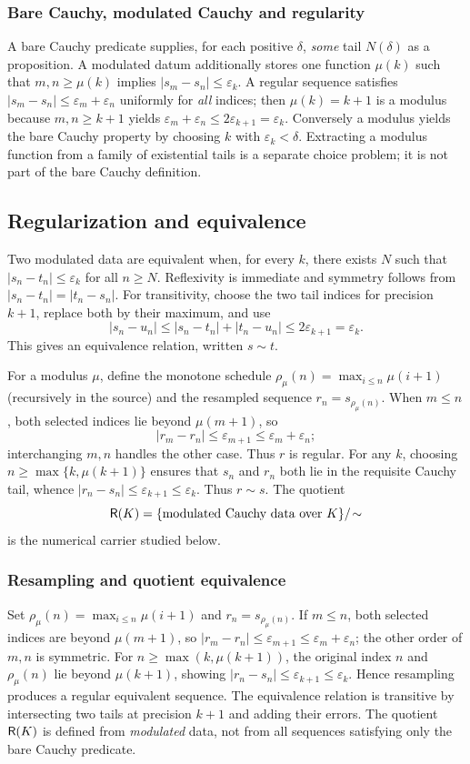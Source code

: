 \documentclass[11pt,reqno]{amsart}
\theoremstyle{definition}\newtheorem{definition}[theorem]{Definition}
\theoremstyle{remark}\newtheorem{remark}[theorem]{Remark}
\newcommand{\eps}{\varepsilon}
\begin{document}
\subsubsection*{Bare Cauchy, modulated Cauchy and regularity}\label{supp:12-2}
A bare Cauchy predicate supplies, for each positive $\delta$, \emph{some} tail $N(\delta)$ as a proposition. A modulated datum additionally stores one function $\mu(k)$ such that $m,n\ge\mu(k)$ implies $|s_m-s_n|\le\eps_k$. A regular sequence satisfies $|s_m-s_n|\le\eps_m+\eps_n$ uniformly for \emph{all} indices; then $\mu(k)=k+1$ is a modulus because $m,n\ge k+1$ yields $\eps_m+\eps_n\le2\eps_{k+1}=\eps_k$. Conversely a modulus yields the bare Cauchy property by choosing $k$ with $\eps_k<\delta$. Extracting a modulus function from a family of existential tails is a separate choice problem; it is not part of the bare Cauchy definition.
\medskip

\subsection{Regularization and equivalence}\label{main:sub-41}
Two modulated data are equivalent when, for every $k$, there exists $N$ such that $|s_n-t_n|\le\eps_k$ for all $n\ge N$. Reflexivity is immediate and symmetry follows from $|s_n-t_n|=|t_n-s_n|$. For transitivity, choose the two tail indices for precision $k+1$, replace both by their maximum, and use
\[
|s_n-u_n|\le |s_n-t_n|+|t_n-u_n|\le 2\eps_{k+1}=\eps_k.
\]
This gives an equivalence relation, written $s\sim t$.

For a modulus $\mu$, define the monotone schedule $\rho_\mu(n)=\max_{i\le n}\mu(i+1)$ (recursively in the source) and the resampled sequence $r_n=s_{\rho_\mu(n)}$. When $m\le n$, both selected indices lie beyond $\mu(m+1)$, so
\[
|r_m-r_n|\le\eps_{m+1}\le\eps_m+\eps_n;
\]
interchanging $m,n$ handles the other case. Thus $r$ is regular. For any $k$, choosing $n\ge\max\{k,\mu(k+1)\}$ ensures that $s_n$ and $r_n$ both lie in the requisite Cauchy tail, whence $|r_n-s_n|\le\eps_{k+1}\le\eps_k$. Thus $r\sim s$. The quotient
\[
\mathsf R(K)=\{\text{modulated Cauchy data over }K\}/\!\sim
\]
is the numerical carrier studied below.


\medskip
\subsubsection*{Resampling and quotient equivalence}\label{supp:12-3}
Set $\rho_\mu(n)=\max_{i\le n}\mu(i+1)$ and $r_n=s_{\rho_\mu(n)}$. If $m\le n$, both selected indices are beyond $\mu(m+1)$, so $|r_m-r_n|\le\eps_{m+1}\le\eps_m+\eps_n$; the other order of $m,n$ is symmetric. For $n\ge\max(k,\mu(k+1))$, the original index $n$ and $\rho_\mu(n)$ lie beyond $\mu(k+1)$, showing $|r_n-s_n|\le\eps_{k+1}\le\eps_k$. Hence resampling produces a regular equivalent sequence. The equivalence relation is transitive by intersecting two tails at precision $k+1$ and adding their errors. The quotient $\mathsf R(K)$ is defined from \emph{modulated} data, not from all sequences satisfying only the bare Cauchy predicate.
\medskip
\end{document}
